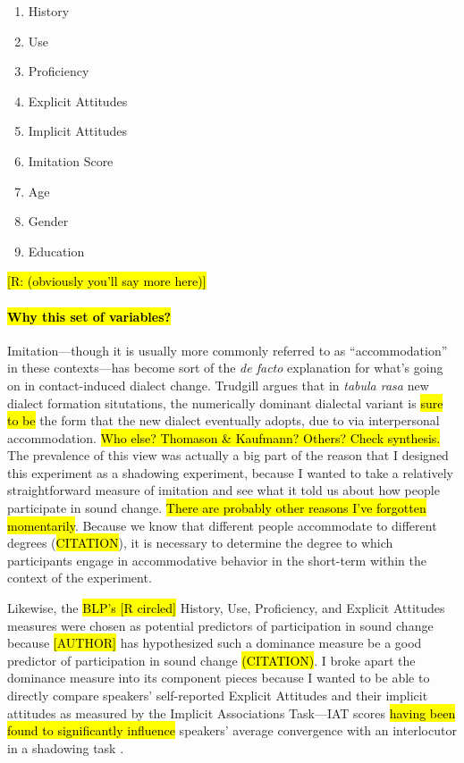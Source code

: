 \begin{enumerate}
    \item History
    \item Use
    \item Proficiency
    \item Explicit Attitudes
    \item Implicit Attitudes
    \item Imitation Score
    \item Age
    \item Gender
    \item Education
\end{enumerate}

\hl{[R: (obviously you'll say more here)]}

\paragraph{\hl{Why this set of variables?}}
Imitation---though it is usually more commonly referred to as ``accommodation'' in these contexts---has become sort of the \textit{de facto} explanation for what's going on in contact-induced dialect change. Trudgill \citeyear{trudgill1986dialects,trudgill2008colonial,trudgill2008on} argues that in \textit{tabula rasa} new dialect formation situtations, the numerically dominant dialectal variant is \hl{sure to be} the form that the new dialect eventually adopts, due to \xxxxx{} via interpersonal accommodation. \hl{Who else? Thomason \& Kaufmann? Others? Check synthesis.} The prevalence of this view was actually a big part of the reason that I designed this experiment as a shadowing experiment, because I wanted to take a relatively straightforward measure of imitation and see what it told us about how people participate in sound change. \hl{There are probably other reasons I've forgotten momentarily}. Because we know that different people accommodate to different degrees (\hl{CITATION}), it is necessary to determine the degree to which participants engage in accommodative behavior in the short-term within the context of the experiment.

Likewise, the \hl{BLP's [R circled]} History, Use, Proficiency, and Explicit Attitudes measures were chosen as potential predictors of participation in sound change because \hl{[AUTHOR]} has hypothesized such a dominance measure be a good predictor of participation in sound change \hl{(CITATION)}. I broke apart the dominance measure into its component pieces because I wanted to be able to directly compare speakers' self-reported Explicit Attitudes and their implicit attitudes as measured by the Implicit Associations Task---IAT scores \hl{having been found to significantly influence} speakers' average convergence with an interlocutor in a shadowing task \citep{babel2010dialect}.

